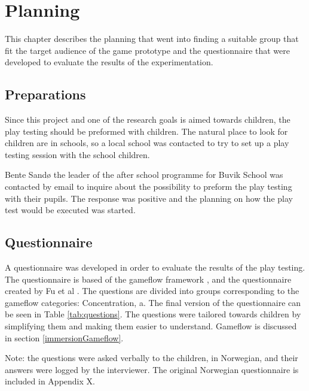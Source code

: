 \chapter{Planning}
This chapter describes the planning that went into finding a suitable group that fit the target audience of the game prototype and the questionnaire that were developed to evaluate the results of the experimentation.


\section{Preparations}
Since this project and one of the research goals is aimed towards children, the play testing should be preformed with children. The natural place to look for children are in schools, so a local school was contacted to try to set up a play testing session with the school children.

Bente Sandø the leader of the after school programme for Buvik School was contacted by email to inquire about the possibility to preform the play testing with their pupils. The response was positive and the planning on how the play test would be executed was started.


\section{Questionnaire}
A questionnaire was developed in order to evaluate the results of the play testing. The questionnaire is based of the gameflow framework \cite{sweetser2005gameflow}, and the questionnaire created by Fu et al \cite{fu2009egameflow}. The questions are divided into groups corresponding to the gameflow categories: Concentration, a. The final version of the questionnaire can be seen in Table \ref{tab:questions}. The questions were tailored towards children by simplifying them and making them easier to understand. Gameflow is discussed in section \ref{immersionGameflow}.

Note: the questions were asked verbally to the children, in Norwegian, and their answers were logged by the interviewer. The original Norwegian questionnaire is included in Appendix X.

